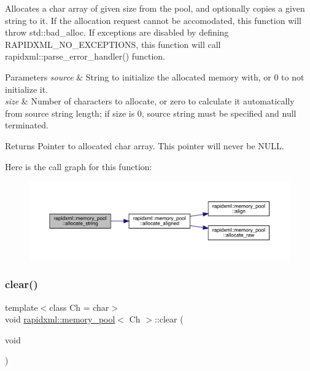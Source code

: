 Allocates a char array of given size from the pool, and optionally copies a given string to it. If the allocation request cannot be accomodated, this function will throw {\ttfamily std\+::bad\+\_\+alloc}. If exceptions are disabled by defining R\+A\+P\+I\+D\+X\+M\+L\+\_\+\+N\+O\+\_\+\+E\+X\+C\+E\+P\+T\+I\+O\+NS, this function will call rapidxml\+::parse\+\_\+error\+\_\+handler() function.
\begin{DoxyParams}{Parameters}
{\em source} & String to initialize the allocated memory with, or 0 to not initialize it.\\
\hline
{\em size} & Number of characters to allocate, or zero to calculate it automatically from source string length; if size is 0, source string must be specified and null terminated. \\
\hline
\end{DoxyParams}
\begin{DoxyReturn}{Returns}
Pointer to allocated char array. This pointer will never be N\+U\+LL. 
\end{DoxyReturn}
Here is the call graph for this function\+:\nopagebreak
\begin{figure}[H]
\begin{center}
\leavevmode
\includegraphics[width=350pt]{classrapidxml_1_1memory__pool_a171941b39d55b868358da97462185f58_cgraph}
\end{center}
\end{figure}
\mbox{\label{classrapidxml_1_1memory__pool_aad377c835fdaed1cb2cc9df194cf84e4}} 
\subsubsection{\texorpdfstring{clear()}{clear()}}
{\footnotesize\ttfamily template$<$class Ch  = char$>$ \\
void \mbox{\hyperlink{classrapidxml_1_1memory__pool}{rapidxml\+::memory\+\_\+pool}}$<$ Ch $>$\+::clear (\begin{DoxyParamCaption}\item[{void}]{ }\end{DoxyParamCaption})\hspace{0.3cm}{\ttfamily [inline]}}

